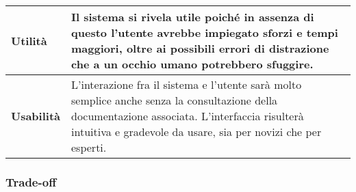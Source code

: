 		\begin{tabular}{|p{3cm}|p{13cm}|}
			\hline
			 			
			\vfill \centering \textbf{Utilità} \vfill & \vfill Il sistema si rivela utile poiché in assenza di questo l'utente avrebbe impiegato sforzi e tempi maggiori, oltre ai possibili errori di distrazione che a un occhio umano potrebbero sfuggire. \vfill \\
			\hline
			\vfill \centering \textbf{Usabilità} \vfill & \vfill L'interazione fra il sistema e l'utente sarà molto semplice anche senza la consultazione della documentazione associata. L'interfaccia risulterà intuitiva e gradevole da usare, sia per novizi che per esperti. \vfill \\
			\hline
			
		\end{tabular}
	
\subsubsection{Trade-off}
	

